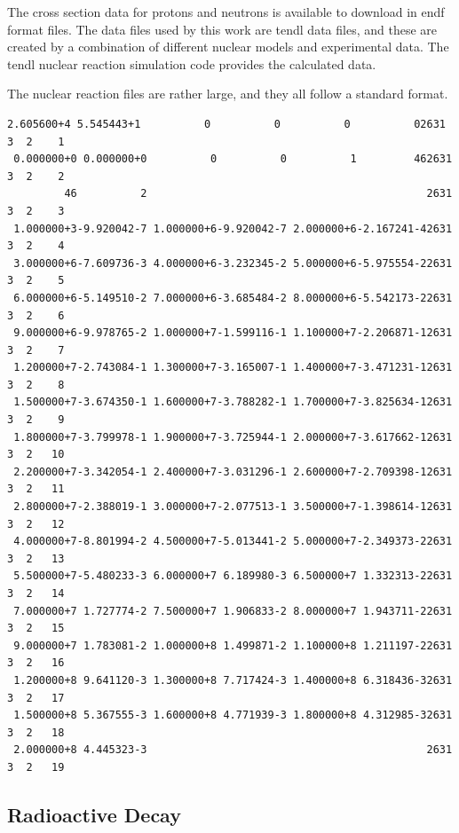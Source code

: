 The cross section data for protons and neutrons is available to download in \acrshort{endf} format files.  The data files used by this work are \acrshort{tendl} data files, and these are created by a combination of different nuclear models and experimental data.  The \acrshort{tendl} nuclear reaction simulation code provides the calculated data.

The nuclear reaction files are rather large, and they all follow a standard format.


\begin{lstlisting}[style=sPseudo,caption={Sample TENDL File}]
 2.605600+4 5.545443+1          0          0          0          02631 3  2    1
 0.000000+0 0.000000+0          0          0          1         462631 3  2    2
         46          2                                            2631 3  2    3
 1.000000+3-9.920042-7 1.000000+6-9.920042-7 2.000000+6-2.167241-42631 3  2    4
 3.000000+6-7.609736-3 4.000000+6-3.232345-2 5.000000+6-5.975554-22631 3  2    5
 6.000000+6-5.149510-2 7.000000+6-3.685484-2 8.000000+6-5.542173-22631 3  2    6
 9.000000+6-9.978765-2 1.000000+7-1.599116-1 1.100000+7-2.206871-12631 3  2    7
 1.200000+7-2.743084-1 1.300000+7-3.165007-1 1.400000+7-3.471231-12631 3  2    8
 1.500000+7-3.674350-1 1.600000+7-3.788282-1 1.700000+7-3.825634-12631 3  2    9
 1.800000+7-3.799978-1 1.900000+7-3.725944-1 2.000000+7-3.617662-12631 3  2   10
 2.200000+7-3.342054-1 2.400000+7-3.031296-1 2.600000+7-2.709398-12631 3  2   11
 2.800000+7-2.388019-1 3.000000+7-2.077513-1 3.500000+7-1.398614-12631 3  2   12
 4.000000+7-8.801994-2 4.500000+7-5.013441-2 5.000000+7-2.349373-22631 3  2   13
 5.500000+7-5.480233-3 6.000000+7 6.189980-3 6.500000+7 1.332313-22631 3  2   14
 7.000000+7 1.727774-2 7.500000+7 1.906833-2 8.000000+7 1.943711-22631 3  2   15
 9.000000+7 1.783081-2 1.000000+8 1.499871-2 1.100000+8 1.211197-22631 3  2   16
 1.200000+8 9.641120-3 1.300000+8 7.717424-3 1.400000+8 6.318436-32631 3  2   17
 1.500000+8 5.367555-3 1.600000+8 4.771939-3 1.800000+8 4.312985-32631 3  2   18
 2.000000+8 4.445323-3                                            2631 3  2   19
\end{lstlisting}








\subsection{Radioactive Decay}

